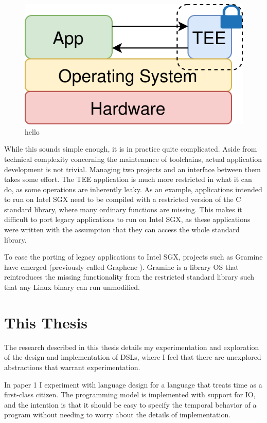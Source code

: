 \begin{figure}
    \centering
    \includegraphics[scale=0.2]{graphics/tee.png}
    \caption{hello}
    \label{graphics:tee}
\end{figure}

While this sounds simple enough, it is in practice quite complicated. Aside from technical complexity
concerning the maintenance of toolchains, actual application development is not trivial. Managing two projects and an
interface between them takes some effort. The TEE application is much more restricted in what it can do, as some
operations are inherently leaky. As an example, applications intended to run on Intel SGX need to be compiled with a
restricted version of the C standard library, where many ordinary functions are missing. This makes it difficult to port
legacy applications to run on Intel SGX, as these applications were written with the assumption that they can access the
whole standard library.

To ease the porting of legacy applications to Intel SGX, projects such as Gramine have emerged (previously called
Graphene \cite{DBLP:conf/usenix/TsaiPV17}). Gramine is a library OS that reintroduces the missing functionality from the
restricted standard library such that any Linux binary can run unmodified.

\section{This Thesis}

The research described in this thesis details my experimentation and exploration of the design and implementation of
DSLs, where I feel that there are unexplored abstractions that warrant experimentation.

In paper 1 I experiment with language design for a language that treats time as a first-class citizen. The programming model
is implemented with support for IO, and the intention is that it should be easy to specify the temporal behavior of a program
without needing to worry about the details of implementation.

